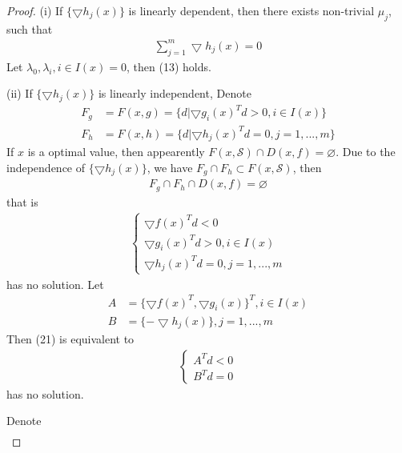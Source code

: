 \documentclass[runningheads]{llncs}
\begin{document}
\begin{proof}
    (i) If $\{\bigtriangledown h_j (x)\}$ is linearly dependent,
    then there exists non-trivial $\mu_j$, such that
    \begin{align}
        \sum_{j=1}^m \bigtriangledown h_j (x) = 0
    \end{align}
    Let $\lambda_0, \lambda_i, i \in I(x) = 0$, then (13) holds.
    \par
    (ii) If $\{\bigtriangledown h_j (x)\}$ is linearly independent,
    Denote
    \begin{align}
        F_g &= F(x, g) = \{ d | \bigtriangledown g_i(x)^Td > 0, i \in I(x)\} \\
        F_h &= F(x, h) = \{ d | \bigtriangledown h_j(x)^Td = 0, j = 1,...,m\}
    \end{align}
    If $x$ is a optimal value, then appearently 
    $F(x, \mathcal{S}) \cap D(x, f) = \varnothing$.
    Due to the independence of $\{\bigtriangledown h_j (x)\}$,
    we have {\color{red}$F_g \cap F_h \subset F(x, \mathcal{S})$},
    then 
    \begin{align}
        F_g \cap F_h \cap D(x, f) = \varnothing
    \end{align}
    that is
    \begin{align}
        \left\{
        \begin{array}{ll}
            \bigtriangledown f(x)^Td < 0 \\
            \bigtriangledown g_i(x)^Td > 0, i \in I(x) \\
            \bigtriangledown h_j (x)^Td  =0, j = 1,...,m
        \end{array}
        \right.
    \end{align}
    has no solution.
    Let 
    \begin{align}
        A &= \{ \bigtriangledown f(x)^T, \bigtriangledown g_i(x)\}^T, i \in I(x) \\
        B &= \{ -\bigtriangledown h_j(x)\}, j = 1,...,m
    \end{align}
    Then (21) is equivalent to
    \begin{align}
        \left\{
        \begin{array}{ll}
            A^T d < 0 \\
            B^T d = 0
        \end{array}
        \right.
    \end{align}
    has no solution.
    \par
    \noindent
    Denote
    \begin{align}

\end{align}
\end{proof}
\end{document}
